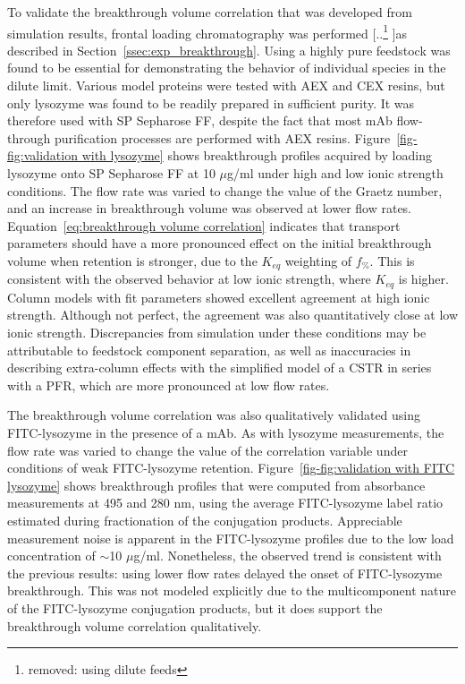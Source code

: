 \documentclass[preprint,review,12pt]{elsarticle}
\providecommand{\DIFaddtex}[1]{{\protect\color{blue} \sf #1}} %
\providecommand{\DIFdeltex}[1]{{\protect\color{red} [..\footnote{removed: #1} ]}} %
\providecommand{\DIFaddbegin}{} %
\providecommand{\DIFaddend}{} %
\providecommand{\DIFdelbegin}{} %
\providecommand{\DIFdelend}{} %
\providecommand{\DIFadd}[1]{\texorpdfstring{\DIFaddtex{#1}}{#1}} %
\providecommand{\DIFdel}[1]{\texorpdfstring{\DIFdeltex{#1}}{}} %
\begin{document}
\DIFdelend To validate the breakthrough volume correlation that was developed from simulation results, frontal loading chromatography was performed \DIFdelbegin \DIFdel{using dilute feeds }\DIFdelend as described in Section~\ref{ssec:exp_breakthrough}. \DIFaddbegin \DIFadd{Using a highly pure feedstock was found to be essential for demonstrating the behavior of individual species in the dilute limit. Various model proteins were tested with AEX and CEX resins, but only lysozyme was found to be readily prepared in sufficient purity. It was therefore used with SP Sepharose FF, despite the fact that most mAb flow-through purification processes are performed with AEX resins. }\DIFaddend Figure~\ref{fig-fig:validation with lysozyme} shows breakthrough profiles acquired by loading lysozyme onto SP Sepharose FF at 10 $\mu$g/ml under high and low ionic strength conditions. The flow rate was varied to change the value of the Graetz number, and an increase in breakthrough volume was observed at lower flow rates. Equation~\ref{eq:breakthrough volume correlation} indicates that transport parameters should have a more pronounced effect on the initial breakthrough volume when retention is stronger, due to the $K_{eq}$ weighting of $f_\% $. This is consistent with the observed behavior at low ionic strength, where $K_{eq}$ is higher. Column models with fit parameters showed excellent agreement at high ionic strength. Although not perfect, the agreement was also quantitatively close at low ionic strength. Discrepancies from simulation under these conditions may be attributable to feedstock component separation, as well as inaccuracies in describing extra-column effects with the simplified model of a CSTR in series with a PFR, which are more pronounced at low flow rates.

        The breakthrough volume correlation was also qualitatively validated using FITC-lysozyme in the presence of a mAb. As with lysozyme measurements, the flow rate was varied to change the value of the correlation variable under conditions of weak FITC-lysozyme retention. Figure~\ref{fig-fig:validation with FITC lysozyme} shows breakthrough profiles that were computed from absorbance measurements at 495 and 280 nm, using the average FITC-lysozyme label ratio estimated during fractionation of the conjugation products. Appreciable measurement noise is apparent in the FITC-lysozyme profiles due to the low load concentration of $\sim$10 $\mu$g/ml. Nonetheless, the observed trend is consistent with the previous results:  using lower flow rates delayed the onset of FITC-lysozyme breakthrough. This was not modeled explicitly due to the multicomponent nature of the FITC-lysozyme conjugation products, but it does support the breakthrough volume correlation qualitatively.
\end{document}
